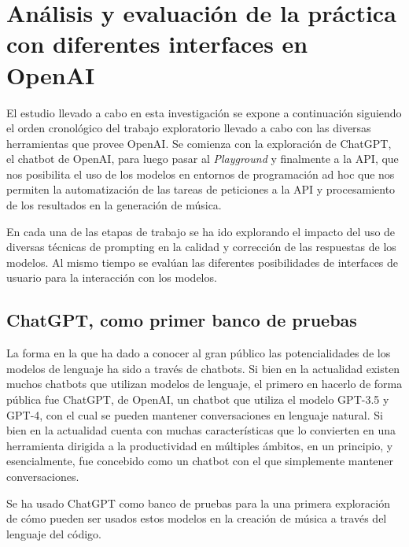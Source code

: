 
\chapter{Análisis y evaluación de la práctica con diferentes interfaces en OpenAI}



El estudio llevado a cabo en esta investigación se expone a continuación siguiendo el orden cronológico del trabajo exploratorio llevado a cabo con las diversas herramientas que provee OpenAI. Se comienza con la exploración de ChatGPT, el chatbot de OpenAI, para luego pasar al \emph{Playground} y finalmente a la API, que nos posibilita el uso de los modelos en entornos de programación ad hoc que nos permiten la automatización de las tareas de peticiones a la API y procesamiento de los resultados en la generación de música.

En cada una de las etapas de trabajo se ha ido explorando el impacto del uso de diversas técnicas de {prompting} en la calidad y corrección de las respuestas de los modelos. Al mismo tiempo se evalúan las diferentes posibilidades de interfaces de usuario para la interacción con los modelos. 

\section{ChatGPT, como primer banco de pruebas}
La forma en la que ha dado a conocer al gran público las potencialidades de los modelos de lenguaje ha sido a través de chatbots. Si bien en la actualidad existen muchos chatbots que utilizan modelos de lenguaje, el primero en hacerlo de forma pública fue ChatGPT, de OpenAI, un chatbot que utiliza el modelo GPT-3.5 y GPT-4, con el cual se pueden mantener conversaciones en lenguaje natural. Si bien en la actualidad cuenta con muchas características que lo convierten en una herramienta dirigida a la productividad en múltiples ámbitos, en un principio, y esencialmente, fue concebido como un chatbot con el que simplemente mantener conversaciones.

Se ha usado ChatGPT como banco de pruebas para la una primera exploración de cómo pueden ser usados estos modelos en la creación de música a través del lenguaje del código.


